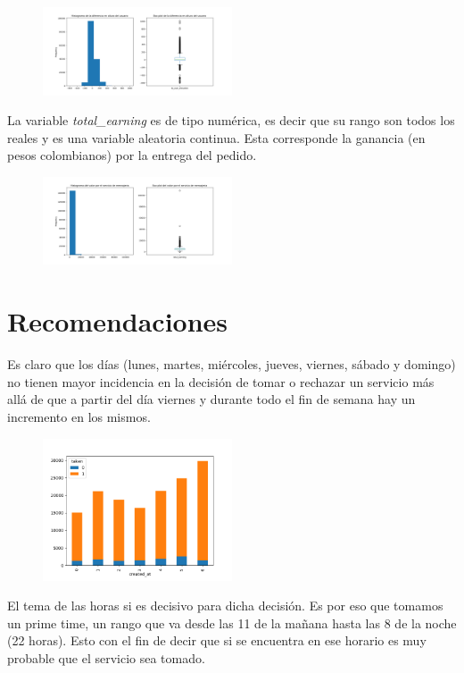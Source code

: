 \documentclass[10pt,a4paper]{article}
\begin{document}
		\begin{figure}[h]
			\centering
			\includegraphics[width=0.5\textwidth]{../Img/to_user_elevation}
		\end{figure}
		La variable \textit{total\_earning} es de tipo numérica, es decir que su rango son todos los reales y es una variable aleatoria continua. Esta corresponde	la ganancia (en pesos colombianos) por la entrega del pedido.\\
		
		\begin{figure}[h]
			\centering
			\includegraphics[width=0.5\textwidth]{../Img/total_earning}
		\end{figure}
	\section{Recomendaciones}
		Es claro que los días (lunes, martes, miércoles, jueves, viernes, sábado y domingo) no tienen mayor incidencia en la decisión de tomar o rechazar un servicio más allá de que a partir del día viernes y durante todo el fin de semana hay un incremento en los mismos.\\
		
		\begin{figure}[h]
			\centering
			\includegraphics[width=0.5\textwidth]{../Img/Figure_2}
		\end{figure}
		El tema de las horas si es decisivo para dicha decisión. Es por eso que tomamos un prime time, un rango que va desde las 11 de la mañana hasta las 8 de la noche (22 horas). Esto con el fin de decir que si se encuentra en ese horario es muy probable que el servicio sea tomado.\\
		
\end{document}
